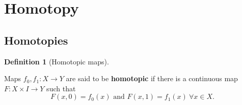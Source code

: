 \documentclass[10pt,]{book}
\newcommand{\terminology}[1]{\textbf{#1}}
\theoremstyle{plain}
\theoremstyle{definition}
\newtheorem{definition}[theorem]{Definition}
\numberwithin{equation}{section}
\begin{document}
\section[Homotopy]{Homotopy}\label{sec-homotopy}
\typeout{************************************************}
\typeout{************************************************}
\subsection[Homotopies]{Homotopies}\label{subsection-1}
\begin{definition}[Homotopic maps]\label{definition-1}

              Maps \(f_0,f_1\colon X \to Y\) are said to be \terminology{homotopic} if there is a
              continuous map \(F\colon X\times I \to Y\) such that
              \[
                F(x,0) = f_0(x)\text{ and }F(x,1) = f_1(x)\ \forall x\in X.
              \]\end{definition}
\end{document}
